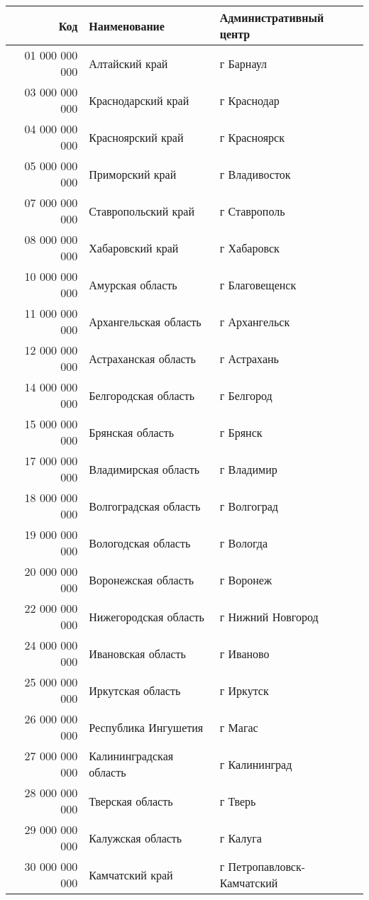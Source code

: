 \documentclass[10pt, a4paper, titlepage]{article}
\begin{document}
\begin{center}
\begin{longtable}{|r|p{}|p{}|}
    \hline
    \textbf{Код} & \textbf{Наименование} & \textbf{Ад\-ми\-нис\-тра\-тив\-ный центр} \\ \hline
    01 000 000 000 & Алтайский край & г Барнаул \\ \hline
    03 000 000 000 & Краснодарский край & г Краснодар \\ \hline
    04 000 000 000 & Красноярский край & г Красноярск \\ \hline
    05 000 000 000 & Приморский край & г Владивосток \\ \hline
    07 000 000 000 & Ставропольский край & г Ставрополь \\ \hline
    08 000 000 000 & Хабаровский край & г Хабаровск \\ \hline
    10 000 000 000 & Амурская область & г Благовещенск \\ \hline
    11 000 000 000 & Архангельская область & г Архангельск \\ \hline
    12 000 000 000 & Астраханская область & г Астрахань \\ \hline
    14 000 000 000 & Белгородская область & г Белгород \\ \hline
    15 000 000 000 & Брянская область & г Брянск \\ \hline
    17 000 000 000 & Владимирская область & г Владимир \\ \hline
    18 000 000 000 & Волгоградская область & г Волгоград \\ \hline
    19 000 000 000 & Вологодская область & г Вологда \\ \hline
    20 000 000 000 & Воронежская область & г Воронеж \\ \hline
    22 000 000 000 & Нижегородская область & г Нижний Новгород \\ \hline
    24 000 000 000 & Ивановская область & г Иваново \\ \hline
    25 000 000 000 & Иркутская область & г Иркутск \\ \hline
    26 000 000 000 & Республика Ингушетия & г Магас \\ \hline
    27 000 000 000 & Калининградская область & г Калининград \\ \hline
    28 000 000 000 & Тверская область & г Тверь \\ \hline
    29 000 000 000 & Калужская область & г Калуга \\ \hline
    30 000 000 000 & Камчатский край & г Петропавловск-Камчатский \\ \hline

\end{longtable}
\end{center}
\end{document}

